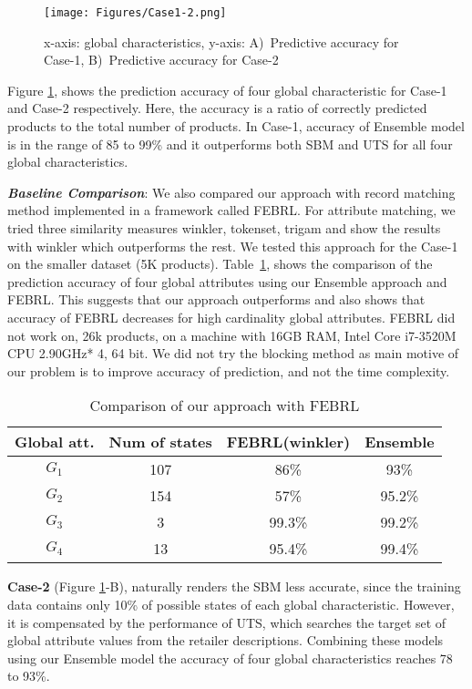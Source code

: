 \begin{figure}
\centering
\texttt{[image: Figures/Case1-2.png]}
\caption{x-axis: global characteristics, y-axis: A)~Predictive accuracy for Case-1, B)~Predictive accuracy for Case-2}
\label{fig:case-1}
\end{figure}

Figure \ref{fig:case-1}, shows the prediction accuracy of four global characteristic for Case-1 and Case-2 respectively. Here, the accuracy is a ratio of correctly predicted products to the total number of products. In Case-1, accuracy of Ensemble model is in the range of 85 to 99\%  and it outperforms both SBM and UTS for all four global characteristics.

\textbf{\textit{Baseline Comparison}}: We also compared our approach with record matching method implemented in a framework called FEBRL\cite{christen2008febrl}. For attribute matching, we tried three similarity measures winkler, tokenset, trigam and show the results with winkler which outperforms the rest. We tested this approach for the Case-1 on the smaller dataset (5K products). Table~\ref{table:comparison}, shows the comparison of the prediction accuracy of four global attributes using our Ensemble approach and FEBRL. This suggests that our approach outperforms and also shows that accuracy of FEBRL decreases for high cardinality global attributes. FEBRL did not work on, 26k products, on a machine with 16GB RAM, Intel Core i7-3520M CPU 2.90GHz* 4, 64 bit. We did not try the blocking method as main motive of our problem is to improve accuracy of prediction, and not the time complexity. 
\renewcommand{\arraystretch}{}
\begin{table}
  \centering
  \begin{tabular}{|c|c|c|c|} 
   \hline
   Global att. & Num of states & FEBRL(winkler) & Ensemble \\
   \hline
   $G_1$ & 107 & 86\% & 93\% \\
   \hline
   $G_2$ & 154 & 57\% & 95.2\% \\
   \hline
   $G_3$ & 3 & 99.3\% & 99.2\% \\
   \hline
   $G_4$ & 13 & 95.4\% & 99.4\% \\
   \hline 
  \end{tabular}
\caption{Comparison of our approach with FEBRL}
  \label{table:comparison}
\end{table}
\textbf{Case-2} (Figure \ref{fig:case-1}-B), naturally renders the SBM less accurate, since the training data contains only 10\% of possible states of each global characteristic. However, it is compensated by the performance of UTS, which searches the target set of global attribute values from the
retailer descriptions. Combining these models using our Ensemble model the accuracy of four global characteristics reaches 78 to 93\%.

